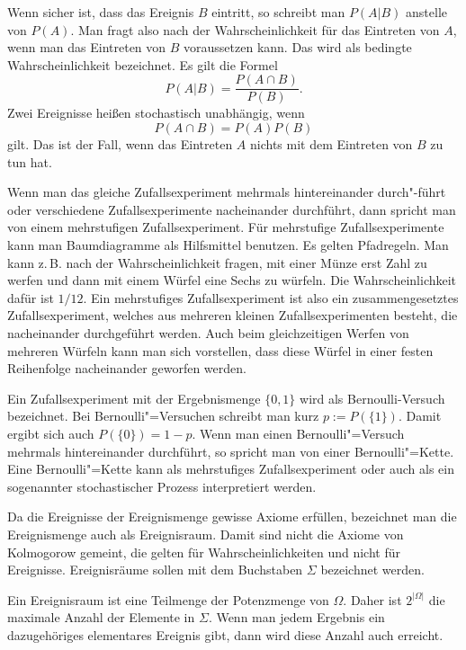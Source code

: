 \documentclass[a4paper,10pt,fleqn,twocolumn,twoside]{article}
\numberwithin{equation}{section}
\begin{document}
Wenn sicher ist, dass das Ereignis $B$ eintritt, so schreibt
man $P(A|B)$ anstelle von $P(A)$. Man fragt also nach der
Wahrscheinlichkeit für das Eintreten von $A$, wenn man das Eintreten
von $B$ voraussetzen kann. Das wird als bedingte Wahrscheinlichkeit
bezeichnet. Es gilt die Formel
\begin{equation}
P(A|B) = \frac{P(A\cap B)}{P(B)}.
\end{equation}
Zwei Ereignisse heißen stochastisch unabhängig, wenn
\begin{equation}
P(A\cap B) = P(A)P(B)
\end{equation}
gilt. Das ist der Fall, wenn das Eintreten $A$ nichts mit dem
Eintreten von $B$ zu tun hat.

Wenn man das gleiche Zufallsexperiment mehrmals hintereinander
durch"-führt oder verschiedene Zufallsexperimente nacheinander
durchführt, dann spricht man von einem mehrstufigen
Zufallsexperiment. Für mehrstufige Zufallsexperimente kann man
Baumdiagramme als Hilfsmittel benutzen. Es gelten Pfadregeln.
Man kann z.\,B. nach der Wahrscheinlichkeit fragen, mit einer Münze
erst Zahl zu werfen und dann mit einem Würfel eine Sechs zu würfeln.
Die Wahrscheinlichkeit dafür ist $1/12$. Ein mehrstufiges
Zufallsexperiment ist also ein zusammengesetztes Zufallsexperiment,
welches aus mehreren kleinen Zufallsexperimenten besteht, die
nacheinander durchgeführt werden. Auch beim gleichzeitigen Werfen
von mehreren Würfeln kann man sich vorstellen, dass diese Würfel
in einer festen Reihenfolge nacheinander geworfen werden.

Ein Zufallsexperiment mit der Ergebnismenge $\{0,1\}$ wird als
Bernoulli-Versuch bezeichnet. Bei Bernoulli"=Versuchen schreibt man
kurz $p:=P(\{1\})$. Damit ergibt sich auch $P(\{0\})=1-p$.
Wenn man einen Bernoulli"=Versuch mehrmals hintereinander durchführt,
so spricht man von einer Bernoulli"=Kette. Eine Bernoulli"=Kette kann
als mehrstufiges Zufallsexperiment oder auch als ein sogenannter
stochastischer Prozess interpretiert werden.

Da die Ereignisse der Ereignismenge gewisse Axiome erfüllen,
bezeichnet man die Ereignismenge auch als Ereignisraum. Damit
sind nicht die Axiome von Kolmogorow gemeint, die gelten für
Wahrscheinlichkeiten und nicht für Ereignisse. Ereignisräume
sollen mit dem Buchstaben $\Sigma$ bezeichnet werden.

Ein Ereignisraum ist eine Teilmenge der Potenzmenge von $\Omega$.
Daher ist $2^{|\Omega|}$ die maximale Anzahl der Elemente in
$\Sigma$. Wenn man jedem Ergebnis ein dazugehöriges elementares
Ereignis gibt, dann wird diese Anzahl auch erreicht.
\end{document}
